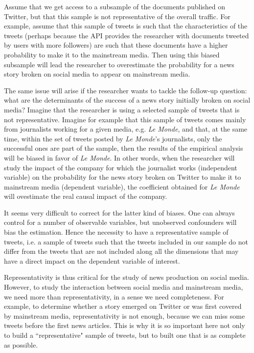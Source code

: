 Assume that we get access to a subsample of the documents published on Twitter,
but that this sample is not representative of the overall traffic. For example, assume that this sample of tweets is
such that the characteristics of the tweets (perhaps because the API provides the researcher with documents tweeted by
users with more followers) are such that these documents have a higher probability to make it to the mainstream media.
Then using this biased subsample will lead the researcher to overestimate the probability for a news story broken on
social media to appear on mainstream media.


The same issue will arise if the researcher wants to tackle the follow-up question: what are the determinants of the
success of a news story initially broken on social media? Imagine that the researcher is using a selected sample of
tweets that is not representative. Imagine for example that this sample of tweets comes mainly from journalists working
for a given media, e.g. \textit{Le Monde}, and that, at the same time, within the set of tweets posted by
\textit{Le Monde}’s journalists, only the successful ones are part of the sample, then the results of the empirical
analysis will be biased in favor of \textit{Le Monde}. In other words, when the researcher will study the impact of the
company for which the journalist works (independent variable) on the probability for the news story broken on Twitter to
make it to mainstream media (dependent variable), the coefficient obtained for \textit{Le Monde} will ovestimate the
real causal impact of the company.


It seems very difficult to correct for the latter kind of biases. One can always control for a number of observable variables,
but unobserved confounders will bias the estimation.
Hence the necessity to have a representative sample of tweets, i.e. a sample of tweets such that the tweets included in
our sample do not differ from the tweets that are not included along all the dimensions that may have a direct impact on
the dependent variable of interest.

Representativity is thus critical for the study of news production on social media.
However, to study the interaction between social media and mainstream media, we need more than representativity, in a sense we need completeness.
For example, to determine whether a story emerged on Twitter or was first covered by mainstream media, representativity is not enough, because we can miss some tweets before the first
news articles. This is why it is so important here not only to build a ``representative" sample of tweets, but to built
one that is as complete as possible.

